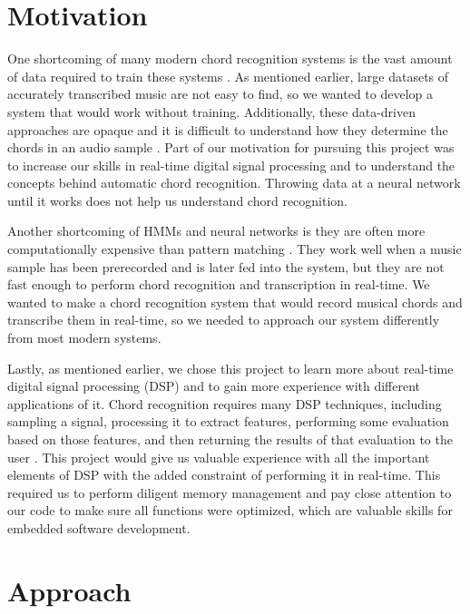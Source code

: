 \documentclass[journal]{IEEEtran}
\begin{document}
\section{Motivation}
One shortcoming of many modern chord recognition systems is the vast amount of data required to train these systems \cite{pauwels}.
As mentioned earlier, large datasets of accurately transcribed music are not easy to find, so we wanted to develop a system that would work without training.
Additionally, these data-driven approaches are opaque and it is difficult to understand how they determine the chords in an audio sample \cite{pauwels}.
Part of our motivation for pursuing this project was to increase our skills in real-time digital signal processing and to understand the concepts behind automatic chord recognition.
Throwing data at a neural network until it works does not help us understand chord recognition.

Another shortcoming of HMMs and neural networks is they are often more computationally expensive than pattern matching \cite{stark}.
They work well when a music sample has been prerecorded and is later fed into the system, but they are not fast enough to perform chord recognition and transcription in real-time.
We wanted to make a chord recognition system that would record musical chords and transcribe them in real-time, so we needed to approach our system differently from most modern systems.

Lastly, as mentioned earlier, we chose this project to learn more about real-time digital signal processing (DSP) and to gain more experience with different applications of it.
Chord recognition requires many DSP techniques, including sampling a signal, processing it to extract features, performing some evaluation based on those features, and then returning the results of that evaluation to the user \cite{fujishima}.
This project would give us valuable experience with all the important elements of DSP with the added constraint of performing it in real-time.
This required us to perform diligent memory management and pay close attention to our code to make sure all functions were optimized, which are valuable skills for embedded software development.


\section{Approach}
\end{document}

